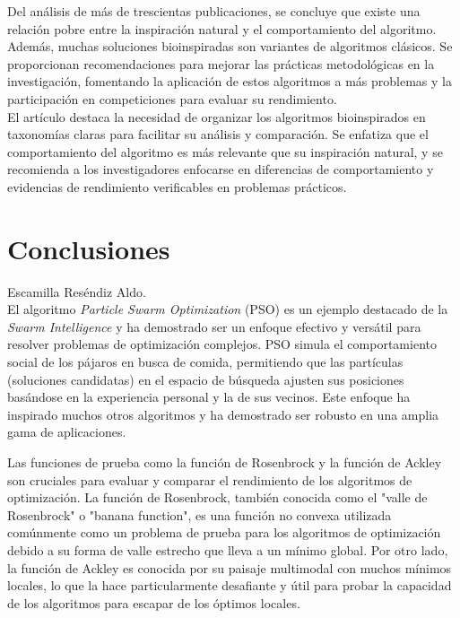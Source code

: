 \documentclass{report}
\begin{document}
    Del análisis de más de trescientas publicaciones, se concluye que existe una relación pobre entre la inspiración natural y el comportamiento del algoritmo. 
    Además, muchas soluciones bioinspiradas son variantes de algoritmos clásicos. Se proporcionan recomendaciones para mejorar las prácticas metodológicas en la investigación, 
    fomentando la aplicación de estos algoritmos a más problemas y la participación en competiciones para evaluar su rendimiento.\\


    El artículo destaca la necesidad de organizar los algoritmos bioinspirados en taxonomías claras para facilitar su análisis y comparación. Se enfatiza que el comportamiento del algoritmo es más relevante que su inspiración natural, 
    y se recomienda a los investigadores enfocarse en diferencias de comportamiento y evidencias de rendimiento verificables en problemas prácticos.\\


    \section{Conclusiones}
    Escamilla Reséndiz Aldo.\\
    El algoritmo \textit{Particle Swarm Optimization} (PSO) es un ejemplo destacado de la \textit{Swarm Intelligence} y ha demostrado ser un enfoque efectivo y versátil para resolver problemas de optimización complejos. PSO simula el comportamiento social de los pájaros en busca de comida, permitiendo que las partículas (soluciones candidatas) en el espacio de búsqueda ajusten sus posiciones basándose en la experiencia personal y la de sus vecinos. Este enfoque ha inspirado muchos otros algoritmos y ha demostrado ser robusto en una amplia gama de aplicaciones.

    Las funciones de prueba como la función de Rosenbrock y la función de Ackley son cruciales para evaluar y comparar el rendimiento de los algoritmos de optimización. La función de Rosenbrock, también conocida como el "valle de Rosenbrock" o "banana function", es una función no convexa utilizada comúnmente como un problema de prueba para los algoritmos de optimización debido a su forma de valle estrecho que lleva a un mínimo global. Por otro lado, la función de Ackley es conocida por su paisaje multimodal con muchos mínimos locales, lo que la hace particularmente desafiante y útil para probar la capacidad de los algoritmos para escapar de los óptimos locales.
\end{document}
